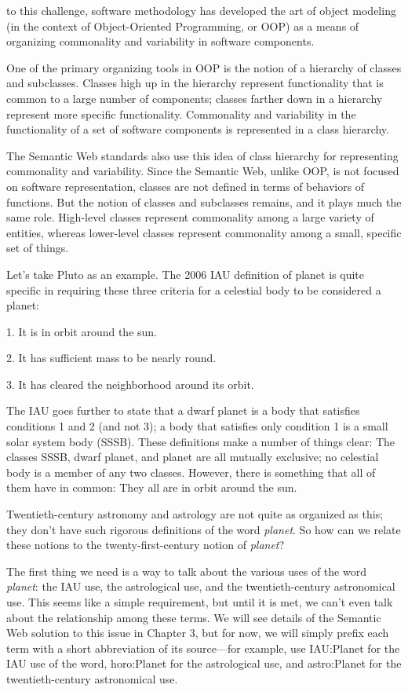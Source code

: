 to this challenge, software methodology has developed the art of object
modeling (in the context of Object-Oriented Programming, or OOP) as a
means of organizing commonality and variability in software components.

One of the primary organizing tools in OOP is the notion of a hierarchy
of classes and subclasses. Classes high up in the hierarchy represent
functionality that is common to a large number of components; classes
farther down in a hierarchy represent more specific functionality.
Commonality and variability in the functionality of a set of software
components is represented in a class hierarchy.

The Semantic Web standards also use this idea of class hierarchy for
representing commonality and variability. Since the Semantic Web, unlike
OOP, is not focused on software representation, classes are not defined
in terms of behaviors of functions. But the notion of classes and
subclasses remains, and it plays much the same role. High-level classes
represent commonality among a large variety of entities, whereas
lower-level classes represent commonality among a small, specific set of
things.

Let's take Pluto as an example. The 2006 IAU definition of planet is
quite specific in requiring these three criteria for a celestial body to
be considered a planet:

1. It is in orbit around the sun.

2. It has sufficient mass to be nearly round.

3. It has cleared the neighborhood around its orbit.

The IAU goes further to state that a dwarf planet is a body that
satisfies conditions 1 and 2 (and not 3); a body that satisfies only
condition 1 is a small solar system body (SSSB). These definitions make
a number of things clear: The classes SSSB, dwarf planet, and planet are
all mutually exclusive; no celestial body is a member of any two
classes. However, there is something that all of them have in common:
They all are in orbit around the sun.

Twentieth-century astronomy and astrology are not quite as organized as
this; they don't have such rigorous definitions of the word
\emph{planet}. So how can we relate these notions to the
twenty-first-century notion of \emph{planet}?

The first thing we need is a way to talk about the various uses of the
word \emph{planet}: the IAU use, the astrological use, and the
twentieth-century astronomical use. This seems like a simple
requirement, but until it is met, we can't even talk about the
relationship among these terms. We will see details of the Semantic Web
solution to this issue in Chapter 3, but for now, we will simply prefix
each term with a short abbreviation of its source---for example, use
IAU:Planet for the IAU use of the word, horo:Planet for the astrological
use, and astro:Planet for the twentieth-century astronomical use.

